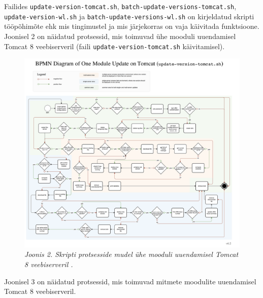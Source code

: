 \documentclass[12pt]{report}
\newcommand{\code}[1]{\texttt{#1}}
\begin{document}
   Failides \code{update-version-tomcat.sh}, \code{batch-update-versions-tomcat.sh}, \code{update-version-wl.sh} ja \code{batch-update-versions-wl.sh} on kirjeldatud skripti tööpõhimõte ehk mis tingimustel ja mis järjekorras on vaja käivitada funktsioone. Joonisel 2 on näidatud protsessid, mis toimuvad ühe mooduli uuendamisel Tomcat 8 veebiserveril (faili \code{update-version-tomcat.sh} käivitamisel).
   
   \begin{figure}[H]
     \begin{center}
       \includegraphics[width=\textwidth]{diagrams/BPMN-diagram-one-module-tomcat.png}
       \caption*{\textit{Joonis 2. Skripti protsesside mudel ühe mooduli uuendamisel Tomcat 8 veebiserveril \footnotemark.}}
     \end{center}
   \end{figure}
   
   
   \newpage
   
   Joonisel 3 on näidatud protsessid, mis toimuvad mitmete moodulite uuendamisel Tomcat 8 veebiserveril.
   
\end{document}
